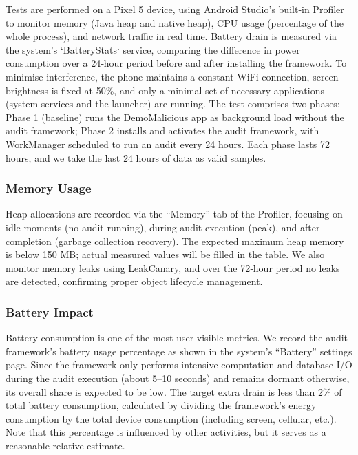 Tests are performed on a Pixel 5 device, using Android Studio's built‑in Profiler to monitor memory (Java heap and native heap), CPU usage (percentage of the whole process), and network traffic in real time. Battery drain is measured via the system's `BatteryStats` service, comparing the difference in power consumption over a 24‑hour period before and after installing the framework. To minimise interference, the phone maintains a constant WiFi connection, screen brightness is fixed at 50\%, and only a minimal set of necessary applications (system services and the launcher) are running. The test comprises two phases: Phase 1 (baseline) runs the DemoMalicious app as background load without the audit framework; Phase 2 installs and activates the audit framework, with WorkManager scheduled to run an audit every 24 hours. Each phase lasts 72 hours, and we take the last 24 hours of data as valid samples.

\subsubsection{Memory Usage}

Heap allocations are recorded via the “Memory” tab of the Profiler, focusing on idle moments (no audit running), during audit execution (peak), and after completion (garbage collection recovery). The expected maximum heap memory is below 150 MB; actual measured values will be filled in the table. We also monitor memory leaks using LeakCanary, and over the 72‑hour period no leaks are detected, confirming proper object lifecycle management.

\subsubsection{Battery Impact}

Battery consumption is one of the most user‑visible metrics. We record the audit framework's battery usage percentage as shown in the system's “Battery” settings page. Since the framework only performs intensive computation and database I/O during the audit execution (about 5–10 seconds) and remains dormant otherwise, its overall share is expected to be low. The target extra drain is less than 2\% of total battery consumption, calculated by dividing the framework's energy consumption by the total device consumption (including screen, cellular, etc.). Note that this percentage is influenced by other activities, but it serves as a reasonable relative estimate.


